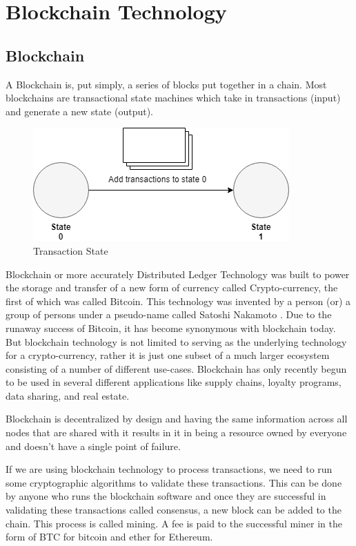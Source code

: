 \documentclass[11pt,openright]{report}
\begin{document}
\chapter{Blockchain Technology}
\label{chapter:blockchain_tech}
\section{Blockchain}
A Blockchain is, put simply, a series of blocks put together in a chain. Most blockchains are transactional state machines which take in transactions (input) and generate a new state (output).
\begin{figure}
    \centering
    \includegraphics[scale=0.5]{images/statemachine.png}
    \caption{Transaction State}
    \label{fig:State Change Diagram}
\end{figure}

Blockchain or more accurately Distributed Ledger Technology was built to power the storage and transfer of a new form of currency called Crypto-currency, the first of which was called Bitcoin. This technology was invented by a person (or) a group of persons under a pseudo-name called Satoshi Nakamoto \cite{nakamoto2012bitcoin}. Due to the runaway success of Bitcoin, it has become synonymous with blockchain today. But blockchain technology is not limited to serving as the underlying technology for a crypto-currency, rather it is just one subset of a much larger ecosystem consisting of a number of different use-cases. Blockchain has only recently begun to be used in several different applications like supply chains, loyalty programs, data sharing, and real estate.

Blockchain is decentralized by design\cite{gencer2018decentralization} and having the same information across all nodes that are shared with it results in it in being a resource owned by everyone and doesn’t have a single point of failure. 

If we are using blockchain technology to process transactions, we need to run some cryptographic algorithms to validate these transactions. This can be done by anyone who runs the blockchain software and once they are successful in validating these transactions called consensus, a new block can be added to the chain. This process is called mining. A fee is paid to the successful miner in the form of BTC for bitcoin and ether for Ethereum.
\end{document}
